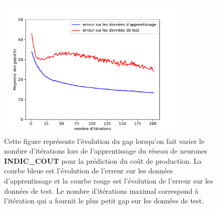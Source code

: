 %
%

\begin{figure}[H]
	\centerline{
		\includegraphics[width=9cm]{images_these/6000_PROD_loss_reseauALternativeLearning2.pdf}}
	\caption[Le gap du réseau INDIC\_COUT]{Cette figure représente l'évolution du gap lorsqu'on fait varier le nombre d'itérations lors de l'apprentissage du réseau de neurones \textbf{INDIC\_COUT} pour la prédiction du coût de production. La courbe bleue est l'évolution de l'erreur sur les données d'apprentissage et la courbe rouge est l'évolution de l'erreur sur les données de test. Le nombre d'itérations maximal correspond à l'itération qui a fournit le plus petit gap sur les données de test. }\label{6000_PROD_loss_prediction_reseauALternativeLearning}
\end{figure}



